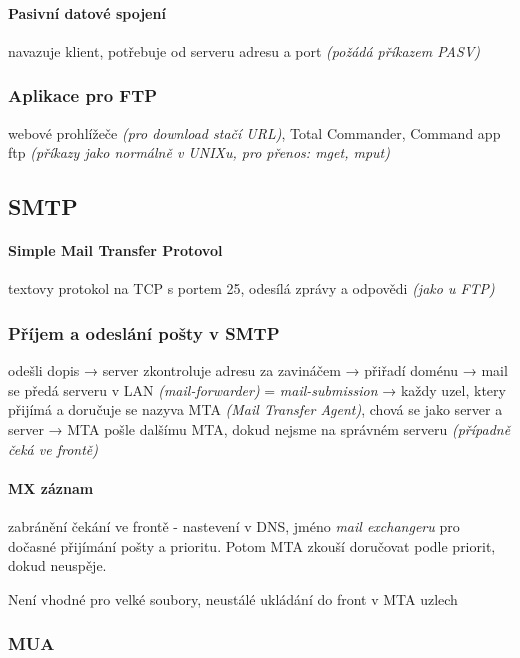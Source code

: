 \documentclass[10pt,a4paper]{article}
\begin{document}
\paragraph{Pasivní datové spojení} navazuje klient, potřebuje od serveru adresu a port \textit{(požádá příkazem PASV)}

\subsubsection{Aplikace pro FTP}

webové prohlížeče \textit{(pro download stačí URL)}, Total Commander, Command app ftp \textit{(příkazy jako normálně v UNIXu, pro přenos: mget, mput)}

\subsection{SMTP}

\paragraph{Simple Mail Transfer Protovol} textovy protokol na TCP s portem 25, odesílá zprávy a odpovědi \textit{(jako u FTP)}

\subsubsection{Příjem a odeslání pošty v SMTP}

odešli dopis → server zkontroluje adresu za zavináčem → přiřadí doménu → mail se předá serveru v LAN \textit{(mail-forwarder)} = \textit{mail-submission} → každy uzel, ktery přijímá a doručuje se nazyva MTA \textit{(Mail Transfer Agent)}, chová se jako server a server → MTA pošle dalšímu MTA, dokud nejsme na správném serveru \textit{(případně čeká ve frontě)}

\paragraph{MX záznam} zabránění čekání ve frontě - nastevení v DNS, jméno \textit{mail exchangeru} pro dočasné přijímání pošty a prioritu. Potom MTA zkouší doručovat podle priorit, dokud neuspěje.

Není vhodné pro velké soubory, neustálé ukládání do front v MTA uzlech

\subsubsection{MUA}
\end{document}
